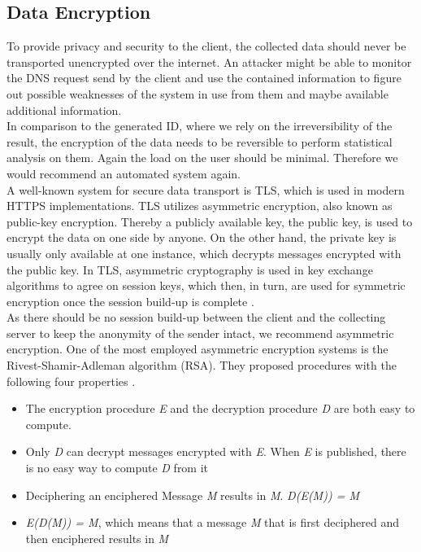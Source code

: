     \subsection{Data Encryption}
        \label{subsec:software_design:encryption}
        To provide privacy and security to the client, the collected data should never be transported unencrypted over the internet. An attacker might be able to monitor the DNS request send by the client and use the contained information to figure out possible weaknesses of the system in use from them and maybe available additional information. \\
        In comparison to the generated ID, where we rely on the irreversibility of the result, the encryption of the data needs to be reversible to perform statistical analysis on them.
        Again the load on the user should be minimal. Therefore we would recommend an automated system again.\\
        A well-known system for secure data transport is TLS, which is used in modern HTTPS implementations. TLS utilizes asymmetric encryption, also known as public-key encryption. 
        Thereby a publicly available key, the public key, is used to encrypt the data on one side by anyone. On the other hand, the private key is usually only available at one instance, which decrypts messages encrypted with the public key. In TLS, asymmetric cryptography is used in key exchange algorithms to agree on session keys, which then, in turn, are used for symmetric encryption once the session build-up is complete \cite{noauthor_how_nodate}.\\
        As there should be no session build-up between the client and the collecting server to keep the anonymity of the sender intact, we recommend asymmetric encryption.
        One of the most employed asymmetric encryption systems is the Rivest-Shamir-Adleman algorithm (RSA). They proposed procedures with the following four properties \cite{rivest_method_1978}.
        \begin{itemize}
            \item The encryption procedure \textit{E} and the decryption procedure \textit{D} are both easy to compute.
            \item Only \textit{D} can decrypt messages encrypted with \textit{E}. When \textit{E} is published, there is no easy way to compute \textit{D} from it
            \item Deciphering an enciphered Message \textit{M} results in \textit{M}. \textit{D(E(M)) = M}
            \item \textit{E(D(M)) = M}, which means that a message \textit{M} that is first deciphered and then enciphered results in \textit{M}
        \end{itemize}

